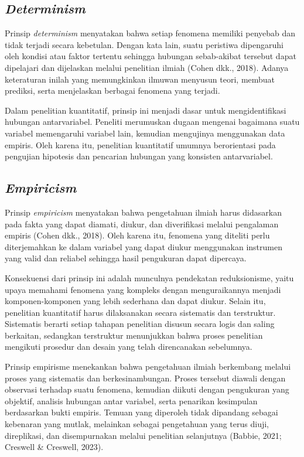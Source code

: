 \documentclass[
  indonesian,
  letterpaper,
  DIV=11,
  numbers=noendperiod]{scrreprt}
\begin{document}
\subsection{\texorpdfstring{\emph{Determinism}}{Determinism}}\label{determinism}

Prinsip \emph{determinism} menyatakan bahwa setiap fenomena memiliki
penyebab dan tidak terjadi secara kebetulan. Dengan kata lain, suatu
peristiwa dipengaruhi oleh kondisi atau faktor tertentu sehingga
hubungan sebab-akibat tersebut dapat dipelajari dan dijelaskan melalui
penelitian ilmiah (Cohen dkk., 2018). Adanya keteraturan inilah yang
memungkinkan ilmuwan menyusun teori, membuat prediksi, serta menjelaskan
berbagai fenomena yang terjadi.

Dalam penelitian kuantitatif, prinsip ini menjadi dasar untuk
mengidentifikasi hubungan antarvariabel. Peneliti merumuskan dugaan
mengenai bagaimana suatu variabel memengaruhi variabel lain, kemudian
mengujinya menggunakan data empiris. Oleh karena itu, penelitian
kuantitatif umumnya berorientasi pada pengujian hipotesis dan pencarian
hubungan yang konsisten antarvariabel.

\subsection{\texorpdfstring{\emph{Empiricism}}{Empiricism}}\label{empiricism}

Prinsip \emph{empiricism} menyatakan bahwa pengetahuan ilmiah harus
didasarkan pada fakta yang dapat diamati, diukur, dan diverifikasi
melalui pengalaman empiris (Cohen dkk., 2018). Oleh karena itu, fenomena
yang diteliti perlu diterjemahkan ke dalam variabel yang dapat diukur
menggunakan instrumen yang valid dan reliabel sehingga hasil pengukuran
dapat dipercaya.

Konsekuensi dari prinsip ini adalah munculnya pendekatan reduksionisme,
yaitu upaya memahami fenomena yang kompleks dengan menguraikannya
menjadi komponen-komponen yang lebih sederhana dan dapat diukur. Selain
itu, penelitian kuantitatif harus dilaksanakan secara sistematis dan
terstruktur. Sistematis berarti setiap tahapan penelitian disusun secara
logis dan saling berkaitan, sedangkan terstruktur menunjukkan bahwa
proses penelitian mengikuti prosedur dan desain yang telah direncanakan
sebelumnya.

Prinsip empirisme menekankan bahwa pengetahuan ilmiah berkembang melalui
proses yang sistematis dan berkesinambungan. Proses tersebut diawali
dengan observasi terhadap suatu fenomena, kemudian diikuti dengan
pengukuran yang objektif, analisis hubungan antar variabel, serta
penarikan kesimpulan berdasarkan bukti empiris. Temuan yang diperoleh
tidak dipandang sebagai kebenaran yang mutlak, melainkan sebagai
pengetahuan yang terus diuji, direplikasi, dan disempurnakan melalui
penelitian selanjutnya (Babbie, 2021; Creswell \& Creswell, 2023).
\end{document}
